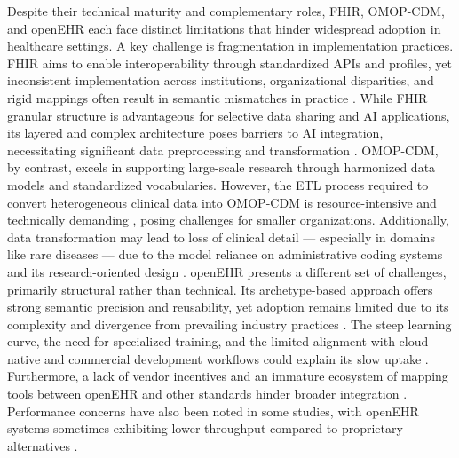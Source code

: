 Despite their technical maturity and complementary roles, FHIR, OMOP-CDM, and openEHR each face distinct limitations that hinder widespread adoption in healthcare settings. A key challenge is fragmentation in implementation practices. FHIR aims to enable interoperability through standardized APIs and profiles, yet inconsistent implementation across institutions, organizational disparities, and rigid mappings often result in semantic mismatches in practice \cite{xiao_development_2021,sinaci2023data,gonzalez-castro_caside_2021,kramer_reducing_2022}. While FHIR granular structure is advantageous for selective data sharing and AI applications, its layered and complex architecture poses barriers to AI integration, necessitating significant data preprocessing and transformation \cite{williams2023standardized}. OMOP-CDM, by contrast, excels in supporting large-scale research through harmonized data models and standardized vocabularies. However, the ETL process required to convert heterogeneous clinical data into OMOP-CDM is resource-intensive and technically demanding \cite{williams2023standardized,almeida_methodology_2021}, posing challenges for smaller organizations. Additionally, data transformation may lead to loss of clinical detail --- especially in domains like rare diseases --- due to the model reliance on administrative coding systems and its research-oriented design \cite{bae_coronary_2022,kohler_eos_2023,seol_effect_2023,byun_analysis_2022,papez_transforming_2023,lamer_transforming_2021,mun_real-world_2021,papez_transforming_2021,carus_mapping_2023,mayer_conversion_2023,oja_transforming_2023}. openEHR presents a different set of challenges, primarily structural rather than technical. Its archetype-based approach offers strong semantic precision and reusability, yet adoption remains limited due to its complexity and divergence from prevailing industry practices \cite{delussu_survey_2024}. The steep learning curve, the need for specialized training, and the limited alignment with cloud-native and commercial development workflows could explain its slow uptake \cite{delussu_survey_2024}. Furthermore, a lack of vendor incentives and an immature ecosystem of mapping tools between openEHR and other standards hinder broader integration \cite{delussu_survey_2024}. Performance concerns have also been noted in some studies, with openEHR systems sometimes exhibiting lower throughput compared to proprietary alternatives \cite{kryszyn_performance_2022}.

